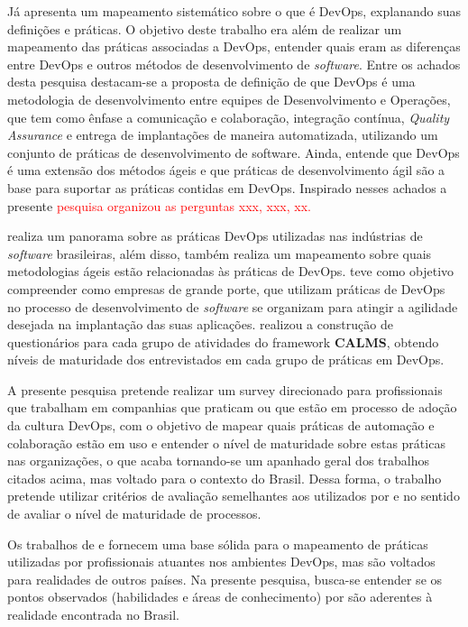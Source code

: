 \documentclass[twoside,english,brazilian]{UNISINOSartigo}
\begin{document}
Já  apresenta um mapeamento sistemático sobre o que é DevOps, explanando suas definições e práticas. O objetivo deste trabalho era além de realizar um mapeamento das práticas associadas a DevOps, entender quais eram as diferenças entre DevOps e outros métodos de desenvolvimento de \textit{software}. Entre os achados desta pesquisa destacam-se a proposta de definição de que DevOps é uma metodologia de desenvolvimento entre equipes de Desenvolvimento e Operações, que tem como ênfase a comunicação e colaboração, integração contínua, \textit{Quality Assurance} e entrega de implantações de maneira automatizada, utilizando um conjunto de práticas de desenvolvimento de software. Ainda, entende que DevOps é uma extensão dos métodos ágeis e que práticas de desenvolvimento ágil são a base para suportar as práticas contidas em DevOps. Inspirado nesses achados a presente \textcolor{red}{pesquisa organizou as perguntas xxx, xxx, xx.}

 realiza um panorama sobre as práticas DevOps utilizadas nas indústrias de \textit{software} brasileiras, além disso, também realiza um mapeamento sobre quais metodologias ágeis estão relacionadas às práticas de DevOps. 
 teve como objetivo compreender como empresas de grande porte, que utilizam práticas de DevOps no processo de desenvolvimento de \textit{software} se organizam para atingir a agilidade desejada na implantação das suas aplicações.  realizou a construção de questionários para cada grupo de atividades do framework \textbf{CALMS}, obtendo níveis de maturidade dos entrevistados em cada grupo de práticas em DevOps.

A presente pesquisa pretende realizar um survey direcionado para profissionais que trabalham em companhias que praticam ou que estão em processo de adoção da cultura DevOps, com o objetivo de mapear quais práticas de automação e colaboração estão em uso e entender o nível de maturidade sobre estas práticas nas organizações, o que acaba tornando-se um apanhado geral dos trabalhos citados acima, mas voltado para o contexto do Brasil.
Dessa forma, o trabalho pretende utilizar critérios de avaliação semelhantes aos utilizados por  e  no sentido de avaliar o nível de maturidade de processos.

Os trabalhos de  e  fornecem uma base sólida para o mapeamento de práticas utilizadas por profissionais atuantes nos ambientes DevOps, mas são voltados para realidades de outros países. Na presente pesquisa, busca-se entender se os pontos observados (habilidades e áreas de conhecimento) por  são aderentes à realidade encontrada no Brasil.
\end{document}
